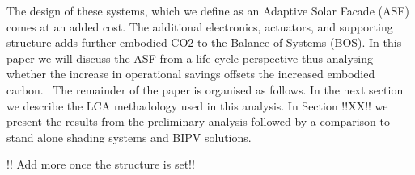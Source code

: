 The design of these systems, which we define as an Adaptive Solar Facade (ASF) comes at an added cost. The additional electronics, actuators, and supporting structure adds further embodied CO2 to the Balance of Systems (BOS). In this paper we will discuss the ASF from a life cycle perspective thus analysing whether the increase in operational savings offsets the increased embodied carbon. \
The remainder of the paper is organised as follows. In the next section we describe the LCA methadology used in this analysis. In Section !!XX!! we present the results from the preliminary analysis followed by a comparison to stand alone shading systems and BIPV solutions. 

!! Add more once the structure is set!! 















